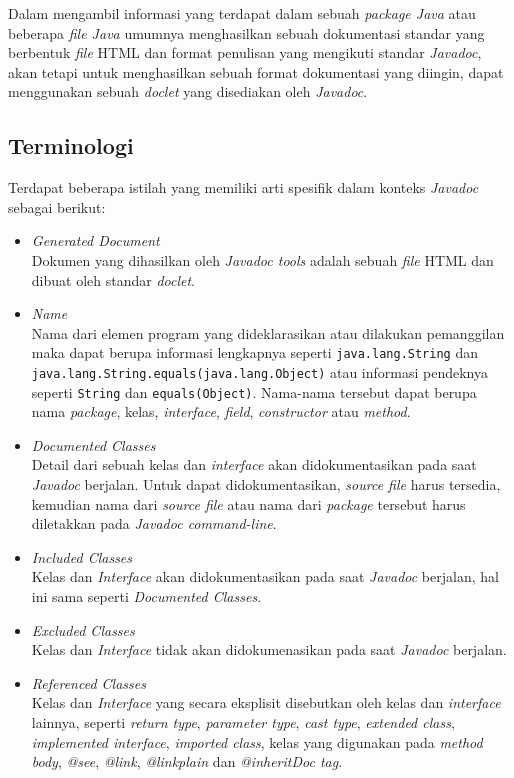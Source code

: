 Dalam mengambil informasi yang terdapat dalam sebuah {\it package Java} atau beberapa {\it file Java} umumnya menghasilkan sebuah dokumentasi standar yang berbentuk {\it file} HTML dan format penulisan yang mengikuti standar {\it Javadoc}, akan tetapi untuk menghasilkan sebuah format dokumentasi yang diingin, dapat menggunakan sebuah {\it doclet} yang disediakan oleh {\it Javadoc}.

\subsection{Terminologi}
\label{sec:terminologi}
Terdapat beberapa istilah yang memiliki arti spesifik dalam konteks {\it Javadoc} sebagai berikut:
\begin{itemize}
	\item {\it Generated Document}\\
	Dokumen yang dihasilkan oleh {\it Javadoc tools} adalah sebuah {\it file} HTML dan dibuat oleh standar {\it doclet}.
	\item {\it Name}\\
	Nama dari elemen program yang dideklarasikan atau dilakukan pemanggilan maka dapat berupa informasi lengkapnya seperti {\tt java.lang.String} dan {\tt java.lang.String.equals(java.lang.Object)} atau informasi pendeknya seperti {\tt String} dan {\tt equals(Object)}. Nama-nama tersebut dapat berupa nama {\it package}, kelas, {\it interface}, {\it field}, {\it constructor} atau {\it method}.
	\item {\it Documented Classes}\\
	Detail dari sebuah kelas dan {\it interface} akan didokumentasikan pada saat {\it Javadoc} berjalan. Untuk dapat didokumentasikan, {\it source file} harus tersedia, kemudian nama dari {\it source file} atau nama dari {\it package} tersebut harus diletakkan pada {\it Javadoc command-line}.
	\item {\it Included Classes}\\
	Kelas dan {\it Interface} akan didokumentasikan pada saat {\it Javadoc} berjalan, hal ini sama seperti {\it Documented Classes}.
	\item {\it Excluded Classes}\\
	Kelas dan {\it Interface} tidak akan didokumenasikan pada saat {\it Javadoc} berjalan.
	\item {\it Referenced Classes}\\
	Kelas dan {\it Interface} yang secara eksplisit disebutkan oleh kelas dan {\it interface} lainnya, seperti {\it return type}, {\it parameter type}, {\it cast type}, {\it extended class}, {\it implemented interface}, {\it imported class}, kelas yang digunakan pada {\it method body}, {\it @see}, {\it {@link}}, {\it {@linkplain}} dan {\it {@inheritDoc} tag}.
\end{itemize}

